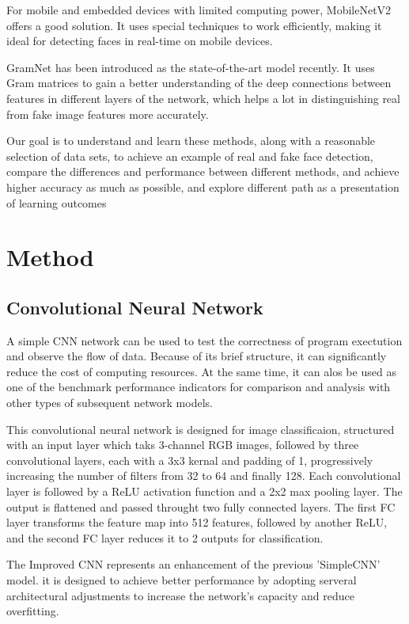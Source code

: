 \documentclass[final]{cvpr}
\begin{document}
For mobile and embedded devices with limited computing power, MobileNetV2 offers a good solution. It uses special techniques to work efficiently, making it ideal for detecting faces in real-time on mobile devices\cite{sandler2019mobilenetv2}.

GramNet has been introduced as the state-of-the-art model recently. It uses Gram matrices to gain a better understanding of the deep connections between features in different layers of the network, which helps a lot in  distinguishing real from fake image features more accurately\cite{liu2020global}.

Our goal is to understand and learn these methods, along with a reasonable selection of data sets, to achieve an example of real and fake face detection, compare the differences and performance between different methods, and achieve higher accuracy as much as possible, and explore different path as a presentation of learning outcomes

\section{Method}

\subsection{Convolutional Neural Network}
A simple CNN network can be used to test the correctness of program exectution and observe the flow of data. Because of its brief structure, it can significantly reduce the cost of computing resources. At the same time, it can alos be used as one of the benchmark performance indicators for comparison and analysis with other types of subsequent network models.

This convolutional neural network is designed for image classificaion, structured with an input layer which taks 3-channel RGB images, followed by three convolutional layers, each with a 3x3 kernal and padding of 1, progressively increasing the number of filters from 32 to 64 and finally 128. Each convolutional layer is followed by a ReLU activation function and a 2x2 max pooling layer. The output is flattened and passed throught two fully connected layers. The first FC layer transforms the feature map into 512 features, followed by another ReLU, and the second FC layer reduces it to 2 outputs for classification. 

The Improved CNN represents an enhancement of the previous 'SimpleCNN' model. it is designed to achieve better performance by adopting serveral architectural adjustments to increase the network's capacity and reduce overfitting.
\end{document}

